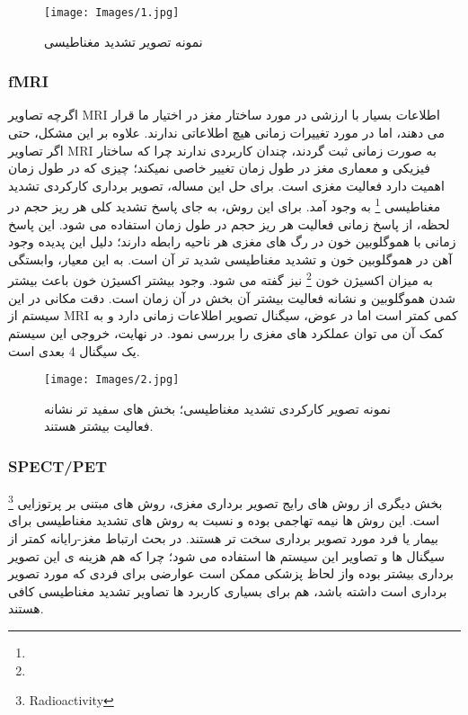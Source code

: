 \documentclass[11pt]{extarticle}
\begin{document}
\begin{figure}[h!]
	\centering
	\texttt{[image: Images/1.jpg]}
	\caption{نمونه تصویر تشدید مغناطیسی}
	\label{fig:3}
\end{figure}

\subsubsection{fMRI}
اگرچه تصاویر 
MRI
اطلاعات بسیار با ارزشی در مورد ساختار مغز در اختیار ما قرار می دهند، اما در مورد تغییرات زمانی هیچ اطلاعاتی ندارند. علاوه بر این مشکل، حتی اگر تصاویر 
MRI
به صورت زمانی ثبت گردند، چندان کاربردی ندارند چرا که ساختار فیزیکی و معماری مغز در طول زمان تغییر خاصی نمیکند؛ چیزی که در طول زمان اهمیت دارد فعالیت مغزی است. برای حل این مساله، تصویر برداری کارکردی تشدید مغناطیسی 
\footnote{}
به وجود آمد. برای این روش، به جای پاسخ تشدید کلی هر ریز حجم در لحظه، از پاسخ زمانی فعالیت هر ریز حجم در طول زمان استفاده می شود. این پاسخ زمانی با هموگلوبین خون در رگ های مغزی هر ناحیه رابطه دارند؛ دلیل این پدیده وجود آهن در هموگلوبین خون و تشدید مغناطیسی شدید تر آن است. به این معیار، وابستگی به میزان اکسیژن خون 
\footnote{}
نیز گفته می شود.
 وجود بیشتر اکسیژن خون باعث بیشتر شدن هموگلوبین و نشانه فعالیت بیشتر آن بخش در آن زمان است. دقت مکانی در این سیستم از 
MRI
کمی کمتر است اما در عوض، سیگنال تصویر اطلاعات زمانی دارد و به کمک آن می توان عملکرد های مغزی را بررسی نمود. در نهایت، خروجی این سیستم یک سیگنال 4 بعدی است.

\begin{figure}[h!]
	\centering
	\texttt{[image: Images/2.jpg]}
	\caption{نمونه تصویر کارکردی تشدید مغناطیسی؛ بخش های سفید تر نشانه فعالیت بیشتر هستند.}
	\label{fig:4}
\end{figure}

\subsubsection{SPECT/PET}
بخش دیگری از روش های رایج تصویر برداری مغزی، روش های مبتنی بر پرتوزایی
\footnote{Radioactivity}
 است. این روش ها نیمه تهاجمی بوده و نسبت به روش های تشدید مغناطیسی برای بیمار یا فرد مورد تصویر برداری سخت تر هستند. در بحث ارتباط مغز-رایانه کمتر از سیگنال ها و تصاویر این سیستم ها استفاده می شود؛ چرا که هم هزینه ی این تصویر برداری بیشتر بوده واز لحاظ پزشکی ممکن است عوارضی برای فردی که مورد تصویر برداری است داشته باشد، هم برای بسیاری کاربرد ها تصاویر تشدید مغناطیسی کافی هستند. 
\end{document}
